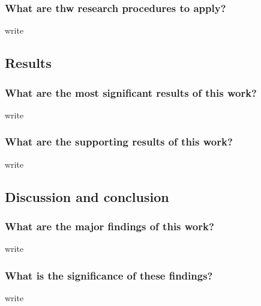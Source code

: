 \documentclass[10pt,a4paper]{article}
\begin{document}
        \subsubsection{What are thw research procedures to apply?}
	    write

        \subsection{Results}
        \subsubsection{What are the most significant results of this work?}
	    write

        \subsubsection{What are the supporting results of this work?}
	    write

        \subsection{Discussion and conclusion}
        \subsubsection{What are the major findings of this work?}
	    write

        \subsubsection{What is the significance of these findings?}
	    write
      


    
\end{document}

